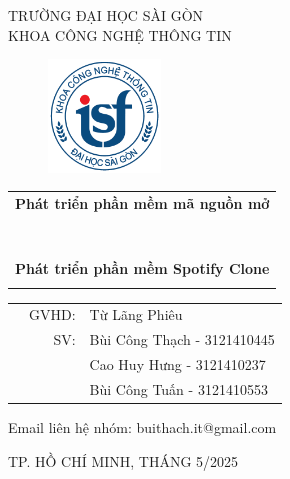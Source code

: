 \documentclass[a4paper]{article}
\begin{document}
\begin{titlepage}
\begin{center}
TRƯỜNG ĐẠI HỌC SÀI GÒN \\
KHOA CÔNG NGHỆ THÔNG TIN
\end{center}
\vspace{1cm}

\begin{figure}[h!]
\begin{center}
\includegraphics[width=3cm]{logoITSGU.png}
\end{center}
\end{figure}

\vspace{1cm}


\begin{center}
\begin{tabular}{c}
	\multicolumn{1}{l}{\textbf{{\Large Phát triển phần mềm mã nguồn mở}}}\\
	~~\\
	\hline
	\\
	\multicolumn{1}{l}{\textbf{{\Large  }}}\\
	\\
	
	\textbf{{\Huge Phát triển phần mềm Spotify Clone}}\\
	\\
	\hline
\end{tabular}
\end{center}

\vspace{3cm}

\begin{table}[h]
\begin{tabular}{rrl}
\hspace{5 cm} & GVHD: &Từ Lãng Phiêu\\
& SV: & Bùi Công Thạch - 3121410445\\
& & Cao Huy Hưng - 3121410237 \\
& & Bùi Công Tuấn - 3121410553 \\
\end{tabular}
\vspace{1 cm}
\end{table}

\begin{center}
    {\footnotesize Email liên hệ nhóm: buithach.it@gmail.com}
\end{center}
\vspace{1 cm}
\begin{center}

{\footnotesize TP. HỒ CHÍ MINH, THÁNG 5/2025}
\end{center}
\end{titlepage}
\end{document}
